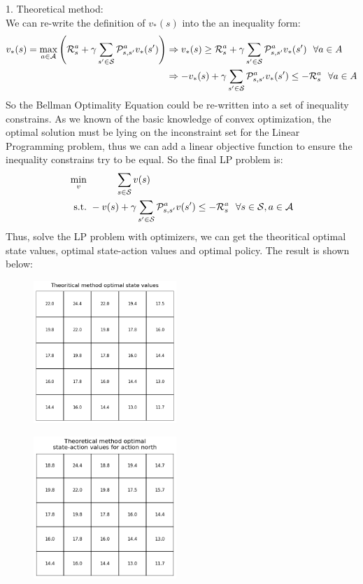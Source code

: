 \begin{homeworkProblem}
1. Theoretical method: \\
We can re-write the definition of $v_*(s)$ into the an inequality form:
\begin{align*}
v_*(s) = \max_{a \in \mathcal{A}}\left(\mathcal{R}_s^a + \gamma \sum_{s' \in \mathcal{S}} \mathcal{P}_{s,s'}^a v_*(s')\right)
&\Rightarrow v_*(s) \geq \mathcal{R}_s^a + \gamma \sum_{s' \in \mathcal{S}} \mathcal{P}_{s,s'}^a v_*(s')\ \ \forall a\in A \\
&\Rightarrow -v_*(s) + \gamma \sum_{s' \in \mathcal{S}} \mathcal{P}_{s,s'}^a v_*(s') \leq -\mathcal{R}_s^a\ \ \forall a\in A
\end{align*}
So the Bellman Optimality Equation could be re-written into a set of inequality constrains. As we known of the basic knowledge of convex optimization, the optimal solution must be lying on the inconstraint set for the Linear Programming problem, thus we can add a linear objective function to ensure the inequality constrains try to be equal. So the final LP problem is:
\begin{align*}
\min_{v} &\qquad\quad \sum_{s \in \mathcal{S}} v(s) \\
\text{s.t.} &\ -v(s) + \gamma \sum_{s' \in \mathcal{S}} \mathcal{P}_{s,s'}^a v(s') \leq -\mathcal{R}_s^a\ \ \forall s\in\mathcal{S}, a\in \mathcal{A}
\end{align*}
Thus, solve the LP problem with optimizers, we can get the theoritical optimal state values, optimal state-action values and optimal policy. The result is shown below:
\begin{figure}[h]
    \centering
    \includegraphics[width=0.48\textwidth]{./figure/p3_output/optimal/theoretical/V_value.png}
\end{figure}
\begin{figure}[h]
    \centering
    \includegraphics[width=0.48\textwidth]{./figure/p3_output/optimal/theoretical/Q_north.png}

\end{figure}
\end{homeworkProblem}
